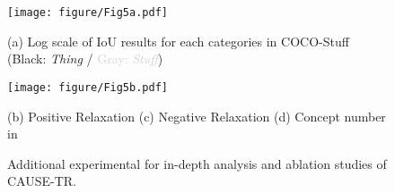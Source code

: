\documentclass{article} \usepackage{iclr2024_conference,times}
\begin{document}
\begin{figure*}[t!]
\vspace{-13mm}
\centering
\texttt{[image: figure/Fig5a.pdf]}
\vspace*{-7mm}
\begin{flushleft}
    {\hspace{0.23cm} (a) Log scale of IoU results for each categories in COCO-Stuff (Black: \textit{Thing} / \textcolor{lightgray}{Gray: \textit{Stuff}})}
\end{flushleft}
\vspace*{-1mm}
\texttt{[image: figure/Fig5b.pdf]}
\vspace*{-6mm}
\begin{flushleft}
    {\hspace{0.35cm} (b) Positive Relaxation  \hspace{0.85cm}(c) Negative Relaxation  \hspace{0.55cm} (d) Concept number  in }
\end{flushleft}	
\vspace*{-0.45cm}
\caption{Additional experimental 
for in-depth analysis and ablation studies of CAUSE-TR.} 
\label{fig:ablation}
\end{figure*}
\end{document}
